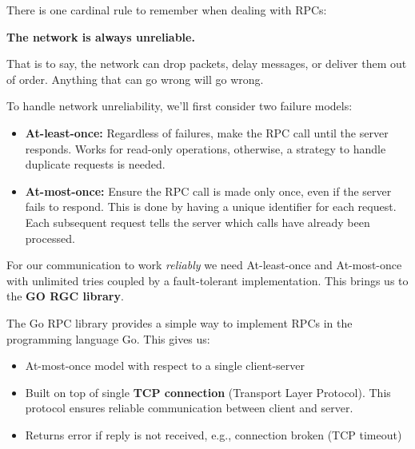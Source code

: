 \noindent
There is one cardinal rule to remember when dealing with RPCs:
\begin{theo}

    \begin{center}
        \Large{\textbf{The network is always unreliable.}}
    \end{center}

    \vspace{1em}

    \noindent
    That is to say, the network can drop packets, delay messages, or deliver them out of order. Anything that 
    can go wrong will go wrong.
\end{theo}

\noindent
To handle network unreliability, we'll first consider two failure models:

\begin{Def}

    \begin{itemize}
        \item \textbf{At-least-once:} Regardless of failures, make the RPC call until the server responds. Works for read-only operations, otherwise, a strategy to handle duplicate requests is needed.
        \item \textbf{At-most-once:} Ensure the RPC call is made only once, even if the server fails to respond. This is done by having a unique identifier for each request. Each subsequent request 
        tells the server which calls have already been processed.
    \end{itemize}
\end{Def}

\newpage

\noindent
For our communication to work \textit{reliably} we need At-least-once and At-most-once with unlimited tries coupled by 
a fault-tolerant implementation. This brings us to the \textbf{GO RGC library}.

\begin{Def}

    The Go RPC library provides a simple way to implement RPCs in the programming language Go. This gives us:
    \begin{itemize}
        \item At-most-once model with respect to a single
        client-server
        \item Built on top of single \textbf{TCP connection} (Transport Layer Protocol). This protocol ensures reliable communication between client and server.
        \item Returns error if reply is not received, e.g.,
        connection broken (TCP timeout)
    \end{itemize}
\end{Def}

